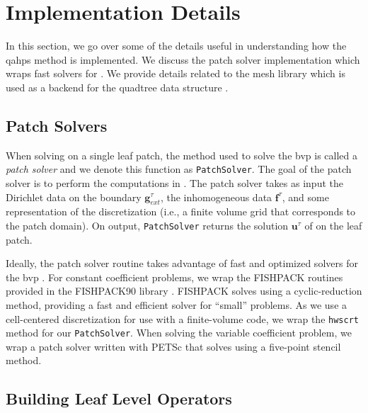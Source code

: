 \section{Implementation Details}
\label{sec:adaptivity}

In this section, we go over some of the details useful in understanding how the \gls{qahps} method is implemented. We discuss the patch solver implementation which wraps fast solvers for . We provide details related to the mesh library \pforest which is used as a backend for the quadtree data structure \citep{burstedde2011p4est}.

\subsection{Patch Solvers}
\label{sub:patch_solvers}

When solving  on a single leaf patch, the method used to solve the \gls{bvp} is called a {\em patch solver} and we denote this function as \texttt{PatchSolver}. The goal of the patch solver is to perform the computations in . The patch solver takes as input the Dirichlet data on the boundary $\textbf{g}_{ext}^{\tau}$, the inhomogeneous data $\textbf{f}^{\tau}$, and some representation of the discretization (i.e., a finite volume grid that corresponds to the patch domain). On output, \texttt{PatchSolver} returns the solution $\textbf{u}^{\tau}$ of  on the leaf patch.

Ideally, the patch solver routine takes advantage of fast and optimized solvers for the \gls{bvp} . For constant coefficient problems, we wrap the FISHPACK routines \citep{swarztrauber1999fishpack} provided in the FISHPACK90 library \citep{adams2016fishpack90}. FISHPACK solves  using a cyclic-reduction method, providing a fast and efficient solver for ``small'' problems. As we use a cell-centered discretization for use with a finite-volume code, we wrap the \texttt{hwscrt} method for our \texttt{PatchSolver}. When solving the variable coefficient problem, we wrap a patch solver written with PETSc \citep{anl2023petsc} that solves  using a five-point stencil method.

\subsection{Building Leaf Level Operators}

